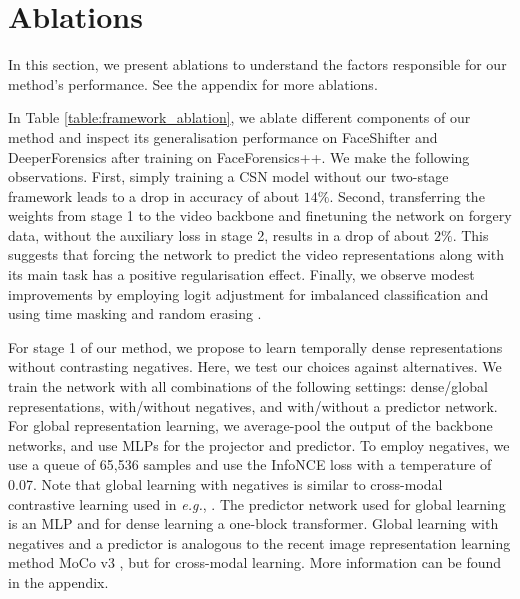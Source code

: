 \documentclass[10pt,twocolumn,letterpaper]{article}
\begin{document}
\section{Ablations} \label{sec:ablations}
In this section, we present ablations to understand the factors responsible for our method's performance. See the appendix for more ablations.

\begin{description}[wide,itemindent=\labelsep]
\item[Framework ablation.] In Table \ref{table:framework_ablation}, we ablate different components of our method and inspect its generalisation performance on FaceShifter and DeeperForensics after training on FaceForensics++. We make the following observations. First, simply training a CSN \cite{tran2019video} model without our two-stage framework leads to a drop in accuracy of about $14\%$. Second, transferring the weights from stage 1 to the video backbone and finetuning the network on forgery data, without the auxiliary loss in stage 2, results in a drop of about $2\%$. This suggests that forcing the network to predict the video representations along with its main task has a positive regularisation effect. Finally, we observe modest improvements by employing logit adjustment \cite{menon2020long} for imbalanced classification and using time masking and random erasing \cite{zhong2020random}.

\item[Representation learning ablation.] For stage 1 of our method, we propose to learn temporally dense representations without contrasting negatives. Here, we test our choices against alternatives. We train the network with all combinations of the following settings: dense/global representations, with/without negatives, and with/without a predictor network. For global representation learning, we average-pool the output of the backbone networks, and use MLPs for the projector and predictor. To employ negatives, we use a queue of 65,536 samples and use the InfoNCE loss \cite{oord2018representation} with a temperature of 0.07. Note that global learning with negatives is similar to cross-modal contrastive learning used in \textit{e.g.}, \cite{morgado2021audio, ma2020active}. The predictor network used for global learning is an MLP and for dense learning a one-block transformer. Global learning with negatives and a predictor is analogous to the recent image representation learning method MoCo v3 \cite{chen2021empirical}, but for cross-modal learning. More information can be found in the appendix.


\end{description}
\end{document}
